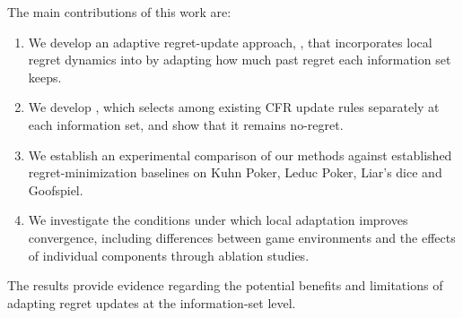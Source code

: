 The main contributions of this work are:
\begin{enumerate}
  \item We develop an adaptive regret-update approach, \ours{}, that incorporates local
        regret dynamics into \cfrp{} by adapting how much past regret each information set
        keeps.
  \item We develop \mix{}, which selects among existing CFR update rules separately at each
        information set, and show that it remains no-regret.
  \item We establish an experimental comparison of our methods against established
        regret-minimization baselines on Kuhn Poker, Leduc Poker, Liar's dice and Goofspiel.
  \item We investigate the conditions under which local adaptation improves
        convergence, including differences between game environments and the effects of
        individual components through ablation studies.
\end{enumerate}
The results provide evidence regarding the potential benefits and limitations of adapting
regret updates at the information-set level.
